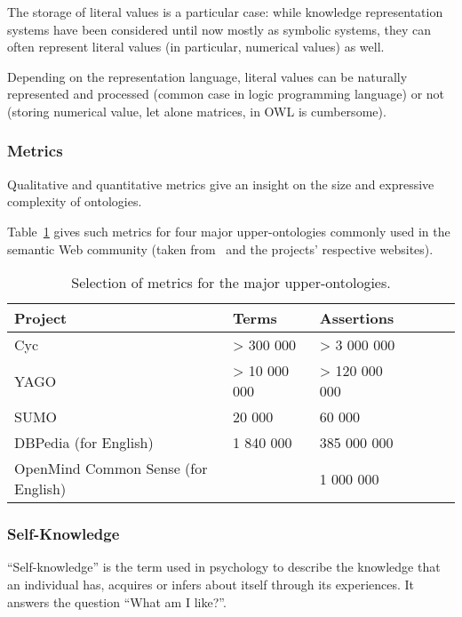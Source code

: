 The storage of literal values is a particular case: while knowledge
representation systems have been considered until now mostly as symbolic
systems, they can often represent literal values (in particular, numerical
values) as well.

Depending on the representation language, literal values can be naturally
represented and processed (common case in logic programming language) or not
(storing numerical value, let alone matrices, in OWL is cumbersome).

\subsubsection{Metrics}

Qualitative and quantitative metrics give an insight on the size and
expressive complexity of ontologies.

Table~\ref{table|upper_onto_metrics} gives such metrics for four major
upper-ontologies commonly used in the semantic Web community (taken
from~\cite{Mascardi2007} and the projects' respective websites).


\begin{table}
\begin{center}

\begin{tabular}{llllll}
\toprule
{\bf Project} & {\bf Terms} & {\bf Assertions} \\
\midrule
Cyc & > 300 000 & > 3 000 000 & \\
YAGO & > 10 000 000 & > 120 000 000 \\
SUMO & 20 000 & 60 000 \\
DBPedia (for English) & 1 840 000 & 385 000 000\\
OpenMind Common Sense (for English) & & 1 000 000\\
\bottomrule

\end{tabular}
\end{center}
\caption{Selection of metrics for the major upper-ontologies.}
\label{table|upper_onto_metrics}
\end{table}



\subsubsection{Self-Knowledge}

``Self-knowledge'' is the term used in psychology to describe the knowledge
that an individual has, acquires or infers about itself through its
experiences. It answers the question ``What am I like?''.

